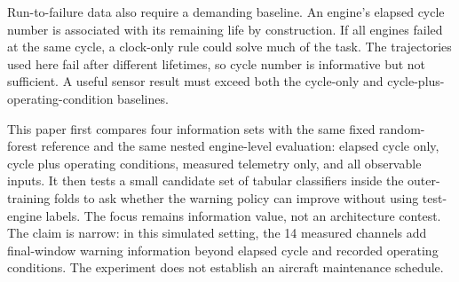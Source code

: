 Run-to-failure data also require a demanding baseline. An engine's elapsed
cycle number is associated with its remaining life by construction. If all
engines failed at the same cycle, a clock-only rule could solve much of the
task. The trajectories used here fail after different lifetimes, so cycle
number is informative but not sufficient. A useful sensor result must exceed
both the cycle-only and cycle-plus-operating-condition baselines.

This paper first compares four information sets with the same fixed
random-forest reference and the same nested engine-level evaluation: elapsed
cycle only, cycle plus operating conditions, measured telemetry only, and all
observable inputs. It then tests a small candidate set of tabular classifiers
inside the outer-training folds to ask whether the warning policy can improve
without using test-engine labels. The focus remains information value, not an
architecture contest. The claim is narrow: in this simulated setting, the 14
measured channels add final-window warning information beyond elapsed cycle and
recorded operating conditions. The experiment does not establish an aircraft
maintenance schedule.
